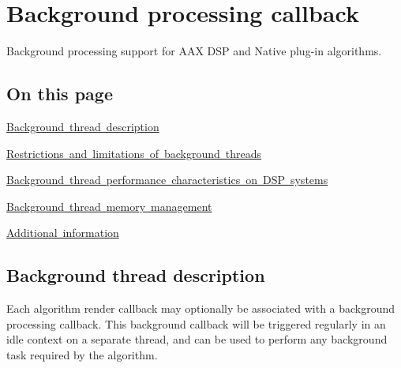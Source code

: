 \hypertarget{a00811}{}\section{Background processing callback}
\label{a00811}
Background processing support for A\+AX D\+SP and Native plug-\/in algorithms. 

\hypertarget{a00811_algbgpagecontents}{}\subsection{On this page}\label{a00811_algbgpagecontents}
\begin{DoxyItemize}
\item \mbox{\hyperlink{a00811_alg_bg_desc}{Background thread description}} \item \mbox{\hyperlink{a00811_alg_bg_restrict}{Restrictions and limitations of background threads}} \item \mbox{\hyperlink{a00811_alg_bg_perf}{Background thread performance characteristics on D\+SP systems}} \item \mbox{\hyperlink{a00811_alg_bg_memmgmt}{Background thread memory management}} \item \mbox{\hyperlink{a00811_alg_bg_additionalinformation}{Additional information}}\end{DoxyItemize}
\hypertarget{a00811_alg_bg_desc}{}\subsection{Background thread description}\label{a00811_alg_bg_desc}
Each algorithm render callback may optionally be associated with a background processing callback. This background callback will be triggered regularly in an idle context on a separate thread, and can be used to perform any background task required by the algorithm.

